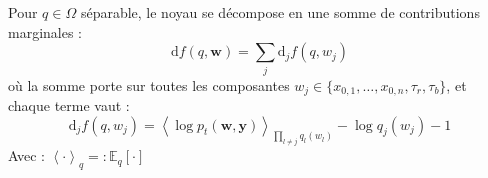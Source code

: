 \documentclass[12pt]{article}
\newcommand{\w}{\boldsymbol{w}}
\newcommand{\y}{\boldsymbol{y}}
\begin{document}
\begin{propositionbox}
\label{prop:gateaux_kernel}
Pour $q \in \Omega$ séparable, le noyau se décompose en une somme de contributions marginales 
:
\begin{equation}
    \mathrm{d}f(q, \w) = \sum_{j} \mathrm{d}_j f(q, w_j)
\end{equation}
où la somme porte sur toutes les composantes $w_j \in \{x_{0,1}, \ldots, x_{0,n}, \tau_r, \tau_b\}$, et chaque terme vaut 
:
\begin{equation}
    \boxed{\mathrm{d}_j f(q, w_j) = \left\langle \log p_t(\w, \y) \right\rangle_{\prod_{l \neq j} q_l(w_l)} - \log q_j(w_j) - 1}
    \label{eq:gateaux_component}
\end{equation}
Avec : \(\left\langle \cdot \right\rangle_q =: \mathbb{E}_q[\cdot] \)
\end{propositionbox}
\end{document}
